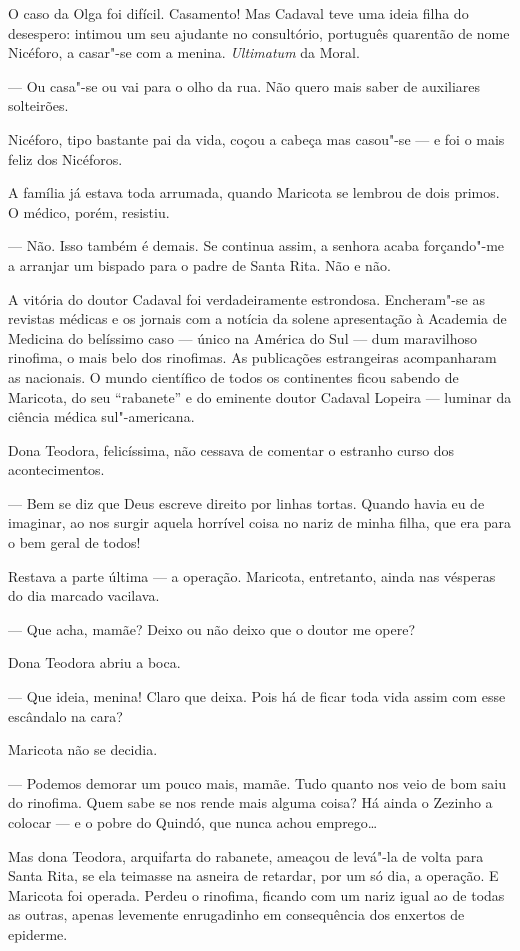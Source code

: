 O caso da Olga foi difícil. Casamento! Mas Cadaval teve uma ideia filha
do desespero: intimou um seu ajudante no consultório, português
quarentão de nome Nicéforo, a casar"-se com a menina. \emph{Ultimatum} da
Moral.

--- Ou casa"-se ou vai para o olho da rua. Não quero mais saber de
auxiliares solteirões.

Nicéforo, tipo bastante pai da vida, coçou a cabeça mas casou"-se --- e
foi o mais feliz dos Nicéforos.

A família já estava toda arrumada, quando Maricota se lembrou de dois
primos. O médico, porém, resistiu.

--- Não. Isso também é demais. Se continua assim, a senhora acaba
forçando"-me a arranjar um bispado para o padre de Santa Rita. Não e não.

A vitória do doutor Cadaval foi verdadeiramente estrondosa. Encheram"-se
as revistas médicas e os jornais com a notícia da solene apresentação à
Academia de Medicina do belíssimo caso --- único na América do Sul ---
dum maravilhoso rinofima, o mais belo dos rinofimas. As publicações
estrangeiras acompanharam as nacionais. O mundo científico de todos os
continentes ficou sabendo de Maricota, do seu ``rabanete'' e do eminente
doutor Cadaval Lopeira --- luminar da ciência médica sul"-americana.

Dona Teodora, felicíssima, não cessava de comentar o estranho curso dos
acontecimentos.

--- Bem se diz que Deus escreve direito por linhas tortas. Quando havia
eu de imaginar, ao nos surgir aquela horrível coisa no nariz de minha
filha, que era para o bem geral de todos!

Restava a parte última --- a operação. Maricota, entretanto, ainda nas
vésperas do dia marcado vacilava.

--- Que acha, mamãe? Deixo ou não deixo que o doutor me opere?

Dona Teodora abriu a boca.

--- Que ideia, menina! Claro que deixa. Pois há de ficar toda vida assim
com esse escândalo na cara?

Maricota não se decidia.

--- Podemos demorar um pouco mais, mamãe. Tudo quanto nos veio de bom
saiu do rinofima. Quem sabe se nos rende mais alguma coisa? Há ainda o
Zezinho a colocar --- e o pobre do Quindó, que nunca achou emprego\ldots{}

Mas dona Teodora, arquifarta do rabanete, ameaçou de levá"-la de volta
para Santa Rita, se ela teimasse na asneira de retardar, por um só dia,
a operação. E Maricota foi operada. Perdeu o rinofima, ficando com um
nariz igual ao de todas as outras, apenas levemente enrugadinho em
consequência dos enxertos de epiderme.

